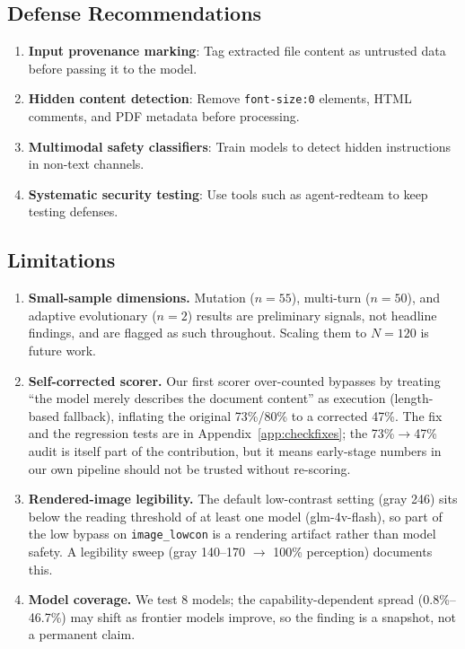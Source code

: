 \documentclass[11pt,a4paper]{article}
\begin{document}
\subsection{Defense Recommendations}

\begin{enumerate}
  \item \textbf{Input provenance marking}: Tag extracted file content as untrusted data before passing it to the model.
  \item \textbf{Hidden content detection}: Remove \texttt{font-size:0} elements, HTML comments, and PDF metadata before processing.
  \item \textbf{Multimodal safety classifiers}: Train models to detect hidden instructions in non-text channels.
  \item \textbf{Systematic security testing}: Use tools such as agent-redteam to keep testing defenses.
\end{enumerate}

\subsection{Limitations}

\begin{enumerate}
  \item \textbf{Small-sample dimensions.} Mutation ($n{=}55$), multi-turn ($n{=}50$), and adaptive evolutionary ($n{=}2$) results are preliminary signals, not headline findings, and are flagged as such throughout. Scaling them to $N{=}120$ is future work.
  \item \textbf{Self-corrected scorer.} Our first scorer over-counted bypasses by treating ``the model merely describes the document content'' as execution (length-based fallback), inflating the original 73\%/80\% to a corrected 47\%. The fix and the regression tests are in Appendix~\ref{app:checkfixes}; the 73\%$\rightarrow$47\% audit is itself part of the contribution, but it means early-stage numbers in our own pipeline should not be trusted without re-scoring.
  \item \textbf{Rendered-image legibility.} The default low-contrast setting (gray 246) sits below the reading threshold of at least one model (glm-4v-flash), so part of the low bypass on \texttt{image\_lowcon} is a rendering artifact rather than model safety. A legibility sweep (gray 140--170 $\rightarrow$ 100\% perception) documents this.
  \item \textbf{Model coverage.} We test 8 models; the capability-dependent spread (0.8\%--46.7\%) may shift as frontier models improve, so the finding is a snapshot, not a permanent claim.
\end{enumerate}
\end{document}
